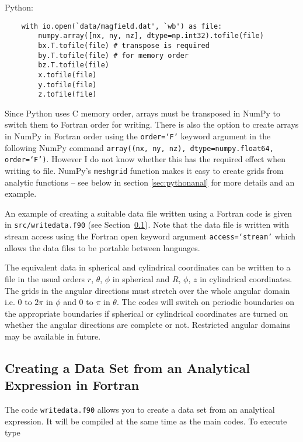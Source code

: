 \documentclass[12pt]{article}
\begin{document}
    Python:

    \begin{verbatim}
    with io.open(`data/magfield.dat', `wb') as file:
        numpy.array([nx, ny, nz], dtype=np.int32).tofile(file)
        bx.T.tofile(file) # transpose is required
        by.T.tofile(file) # for memory order
        bz.T.tofile(file)
        x.tofile(file)
        y.tofile(file)
        z.tofile(file)
    \end{verbatim}

    Since Python uses C memory order, arrays must be transposed in NumPy to switch them to Fortran order for writing. There is also the option to create arrays in NumPy in Fortran order using the \texttt{order=`F'} keyword argument in the following NumPy command \texttt{array((nx, ny, nz), dtype=numpy.float64, order=`F')}. However I do not know whether this has the required effect when writing to file. NumPy's \texttt{meshgrid} function makes it easy to create grids from analytic functions -- see below in section \ref{sec:pythonanal} for more details and an example.

    An example of creating a suitable data file written using a Fortran code is given in \texttt{src/writedata.f90} (see Section~\ref{sec:writedata}). Note that the data file is written with stream access using the Fortran open keyword argument \texttt{access=`stream'} which allows the data files to be portable between languages.

    The equivalent data in spherical and cylindrical coordinates can be written to a file in the usual orders \( r \), \( \theta \), \( \phi \) in spherical and \( R \), \( \phi \), \( z \) in cylindrical coordinates. The grids in the angular directions must stretch over the whole angular domain i.e. \( 0 \) to \( 2\pi \) in \( \phi \) and \( 0 \) to \( \pi \) in \( \theta \). The codes will switch on periodic boundaries on the appropriate boundaries if spherical or cylindrical coordinates are turned on whether the angular directions are complete or not. Restricted angular domains may be available in future.

    \subsection{Creating a Data Set from an Analytical Expression in Fortran}
      \label{sec:writedata}

      The code \texttt{writedata.f90} allows you to create a data set from an analytical expression. It will be compiled at the same time as the main codes. To execute type
\end{document}
